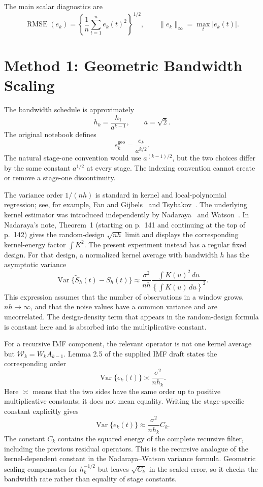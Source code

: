 \documentclass[11pt]{article}
\newcommand{\Var}{\operatorname{Var}}
\newcommand{\RMSE}{\operatorname{RMSE}}
\newcommand{\Wcal}{\mathcal{W}}
\begin{document}
The main scalar diagnostics are
\[
\RMSE(e_k)=\left\{\frac{1}{n}\sum_{t=1}^n e_k(t)^2\right\}^{1/2},
\qquad
\lVert e_k\rVert_\infty=\max_t |e_k(t)|.
\]

\section{Method 1: Geometric Bandwidth Scaling}

The bandwidth schedule is approximately
\[
h_k=\frac{h_1}{a^{k-1}},
\qquad a=\sqrt{2}.
\]
The original notebook defines
\[
e_k^{\mathrm{geo}}=\frac{e_k}{a^{k/2}}.
\]
The natural stage-one convention would use $a^{(k-1)/2}$, but the two choices
differ by the same constant $a^{1/2}$ at every stage. The indexing convention
cannot create or remove a stage-one discontinuity.

The variance order $1/(nh)$ is standard in kernel and local-polynomial
regression; see, for example, Fan and Gijbels~\cite{fan-gijbels1996} and
Tsybakov~\cite{tsybakov2009}. The underlying kernel estimator was introduced
independently by Nadaraya~\cite{nadaraya1964} and Watson~\cite{watson1964}.
In Nadaraya's note, Theorem~1 (starting on p.~141 and continuing at the top of
p.~142) gives the random-design $\sqrt{nh}$ limit and displays the corresponding
kernel-energy factor $\int K^2$.  The present experiment instead has a regular
fixed design.  For that design, a normalized kernel average with bandwidth $h$
has the asymptotic variance
\[
\Var\{\widetilde S_h(t)-S_h(t)\}
\approx
\frac{\sigma^2}{nh}
\frac{\int K(u)^2\,du}{\left\{\int K(u)\,du\right\}^2}.
\]
This expression assumes that the number of observations in a window grows,
$nh\to\infty$, and that the noise values have a common variance and are
uncorrelated. The design-density term that appears in the random-design formula
is constant here and is absorbed into the multiplicative constant.

For a recursive IMF component, the relevant operator is not one kernel average
but $\Wcal_k=W_kA_{k-1}$. Lemma 2.5 of the supplied IMF draft
\cite{spokoiny2026} states the corresponding order
\[
\Var\{e_k(t)\}
\asymp \frac{\sigma^2}{nh_k}.
\]
Here $\asymp$ means that the two sides have the same order up to positive
multiplicative constants; it does not mean equality. Writing the stage-specific
constant explicitly gives
\[
\Var\{e_k(t)\}
\approx \frac{\sigma^2}{nh_k}C_k.
\]
The constant $C_k$ contains the squared energy of the complete recursive filter,
including the previous residual operators. This is the recursive analogue of
the kernel-dependent constant in the Nadaraya--Watson variance formula.
Geometric scaling compensates for $h_k^{-1/2}$ but leaves $\sqrt{C_k}$ in the
scaled error, so it checks the bandwidth rate rather than equality of stage
constants.
\end{document}
